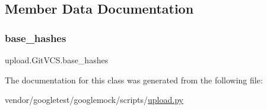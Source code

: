 \subsection{Member Data Documentation}
\mbox{\label{classupload_1_1_git_v_c_s_a07e9469050a157f34fe804cdf6ecddac}} 
\subsubsection{\texorpdfstring{base\+\_\+hashes}{base\_hashes}}
{\footnotesize\ttfamily upload.\+Git\+V\+C\+S.\+base\+\_\+hashes}



The documentation for this class was generated from the following file\+:\begin{DoxyCompactItemize}
\item 
vendor/googletest/googlemock/scripts/\hyperlink{googlemock_2scripts_2upload_8py}{upload.\+py}\end{DoxyCompactItemize}
